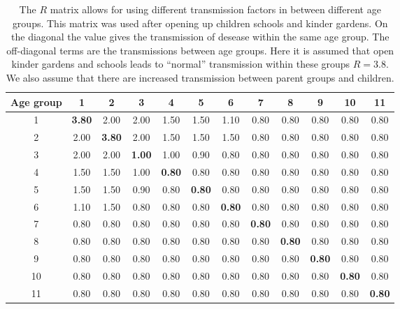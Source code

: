 \documentclass[twoside,11pt]{article}
\begin{document}
\begin{table}[htb]
\begin{center}
\tabcolsep=3.5pt
\begin{tabular}{c|ccccccccccc}
\hline
 Age group & 1      & 2      & 3      & 4      & 5      & 6      & 7      & 8      & 9      & 10     & 11      \\
\hline
    1      & \bf 3.80   & 2.00   &   2.00 &     1.50 &     1.50  &    1.10  &    0.80  &    0.80  &    0.80  &    0.80 &     0.80  \\
    2      & 2.00   & \bf 3.80   &   2.00 &     1.50 &     1.50  &    1.50  &    0.80  &    0.80  &    0.80  &    0.80 &     0.80  \\
    3      & 2.00   & 2.00   &  \bf  1.00 &     1.00 &     0.90  &    0.80  &    0.80  &    0.80  &    0.80  &    0.80 &     0.80  \\
    4      & 1.50   & 1.50   &   1.00 &   \bf   0.80 &     0.80  &    0.80  &    0.80  &    0.80  &    0.80  &    0.80 &     0.80  \\
    5      & 1.50   & 1.50   &   0.90 &     0.80 &  \bf    0.80  &    0.80  &    0.80  &    0.80  &    0.80  &    0.80 &     0.80  \\
    6      & 1.10   & 1.50   &   0.80 &     0.80 &     0.80  &  \bf   0.80  &    0.80  &    0.80  &    0.80  &    0.80 &     0.80  \\
    7      & 0.80   & 0.80   &   0.80 &     0.80 &     0.80  &    0.80  &  \bf   0.80  &    0.80  &    0.80  &    0.80 &     0.80  \\
    8      & 0.80   & 0.80   &   0.80 &     0.80 &     0.80  &    0.80  &    0.80  & \bf    0.80  &    0.80  &    0.80 &     0.80  \\
    9      & 0.80   & 0.80   &   0.80 &     0.80 &     0.80  &    0.80  &    0.80  &    0.80  &  \bf   0.80  &    0.80 &     0.80  \\
    10     & 0.80   & 0.80   &   0.80 &     0.80 &     0.80  &    0.80  &    0.80  &    0.80  &    0.80  & \bf    0.80 &     0.80  \\
    11     & 0.80   & 0.80   &   0.80 &     0.80 &     0.80  &    0.80  &    0.80  &    0.80  &    0.80  &    0.80 &  \bf    0.80  \\
\hline
\end{tabular}
\end{center}
\caption{The $R$ matrix allows for using different transmission factors in between different age groups.
This matrix was used after opening up children schools and kinder gardens. On the diagonal the value gives the 
transmission of desease within the same age group. The off-diagonal terms are the transmissions between age groups.
Here it is assumed that open kinder gardens and schools leads to ``normal'' transmission within these groups $R=3.8$.
We also assume that there are increased transmission between parent groups and children.
\label{tab:R}}
\end{table}
%
\end{document}
